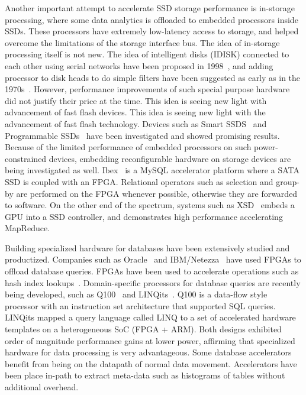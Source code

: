 Another important attempt to accelerate SSD storage performance is in-storage
processing, where some data analytics is offloaded to embedded processors inside
SSDs. These processors have extremely low-latency access to storage, and helped
overcome the limitations of the storage interface bus. The idea of in-storage
processing itself is not new. The idea of intelligent disks (IDISK) connected to
each other using serial networks have been proposed in 1998~\cite{idisk}, and
adding processor to disk heads to do simple filters have been suggested as early
as in the 1970s~\cite{?,?,?}. However, performance improvements of such special
purpose hardware did not justify their price at the time. This idea is seeing
new light with advancement of fast flash devices. This idea is seeing new light
with the advancement of fast flash technology. Devices such as Smart
SSDS~\cite{smartssdquery,smartssdcost,ucsd_willow} and Programmable
SSDs~\cite{xsd} have been investigated and showed promising results. Because of
the limited performance of embedded processors on such power-constrained
devices, embedding reconfigurable hardware on storage devices are being
investigated as well. Ibex~\cite{ibex} is a MySQL accelerator platform where a
SATA SSD is coupled with an FPGA. Relational operators such as selection and
group-by are performed on the FPGA whenever possible, otherwise they are
forwarded to software. On the other end of the spectrum, systems such as
XSD~\cite{xsd} embeds a GPU into a SSD controller, and demonstrates high
performance accelerating MapReduce.

Building specialized hardware for databases have been extensively studied and
productized. Companies such as Oracle~\cite{exadata} and
IBM/Netezza~\cite{netezza} have used FPGAs to offload database queries.
FPGAs have been used to accelerate operations such as hash index
lookups~\cite{walkers}. Domain-specific processors for database queries are
recently being developed, such as Q100~\cite{q100} and LINQits~\cite{linqits}.
Q100 is a data-flow style processor with an instruction set architecture that
supported SQL queries. LINQits mapped a query language called LINQ to a set of
accelerated hardware templates on a heterogeneous SoC (FPGA + ARM). Both designs
exhibited order of magnitude performance gains at lower power, affirming that
specialized hardware for data processing is very advantageous.
Some database accelerators benefit from being on the datapath of normal data
movement. Accelerators have been place in-path to extract meta-data such as
histograms of tables without additional overhead.

